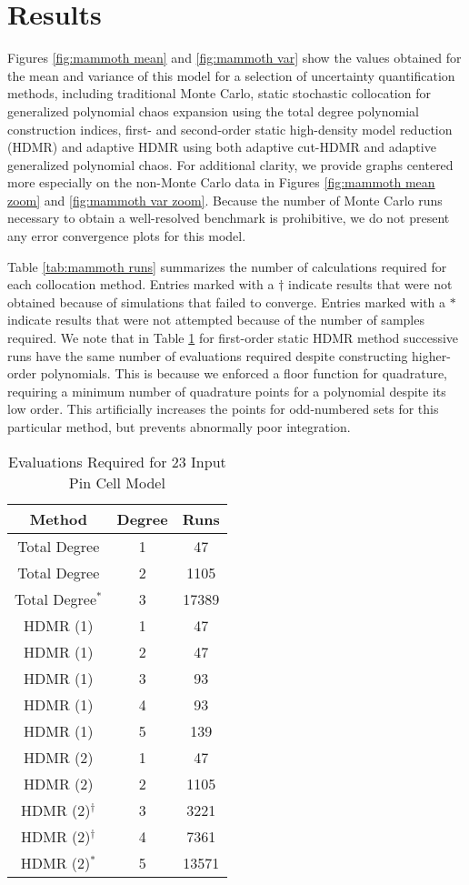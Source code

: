 \section{Results}
Figures \ref{fig:mammoth mean} and \ref{fig:mammoth var} show the values obtained for the mean and variance of
this model for a selection of uncertainty quantification methods, including
traditional Monte Carlo,
static stochastic collocation for generalized polynomial chaos expansion using the total degree polynomial
construction indices, 
first- and second-order static high-density model reduction (HDMR)
and adaptive HDMR using both adaptive cut-HDMR and adaptive generalized polynomial chaos.
 For additional clarity, we provide graphs centered more especially on the non-Monte
Carlo data in Figures \ref{fig:mammoth mean zoom} and \ref{fig:mammoth var zoom}.  Because the number of Monte
Carlo runs necessary to obtain a well-resolved benchmark is prohibitive, we do not present any error
convergence plots for this model.

Table \ref{tab:mammoth
runs} summarizes the number of calculations required for each collocation method.  Entries marked with a
$\dagger$ indicate results that were not obtained because of \mammoth{} simulations that failed to converge.
Entries marked with a $*$ indicate results that were not attempted because of the number of samples required.
We note that in Table \ref{tab:mammoth} for first-order static HDMR method successive runs have the same
number of evaluations required despite constructing higher-order polynomials.  This is because we enforced a
floor function for quadrature, requiring a minimum number of quadrature points for a polynomial despite its
low order.  This
artificially increases the points for odd-numbered sets for this particular method, but prevents abnormally
poor integration.
\begin{table}
  \centering
  \begin{tabular}{c c|c}
    Method & Degree & Runs \\ \hline
    Total Degree & 1 & 47 \\
    Total Degree & 2 & 1105 \\
    Total Degree$^*$ & 3 & 17389 \\ \hline
    HDMR (1) & 1 & 47 \\
    HDMR (1) & 2 & 47 \\
    HDMR (1) & 3 & 93 \\
    HDMR (1) & 4 & 93 \\
    HDMR (1) & 5 & 139\\ \hline
    HDMR (2) & 1 & 47 \\
    HDMR (2) & 2 & 1105 \\
    HDMR (2)$^\dagger$ & 3 & 3221 \\
    HDMR (2)$^\dagger$ & 4 & 7361 \\
    HDMR (2)$^*$ & 5 & 13571 \\
  \end{tabular}
  \caption{Evaluations Required for 23 Input Pin Cell Model}
  \label{tab:mammoth}
\end{table}

